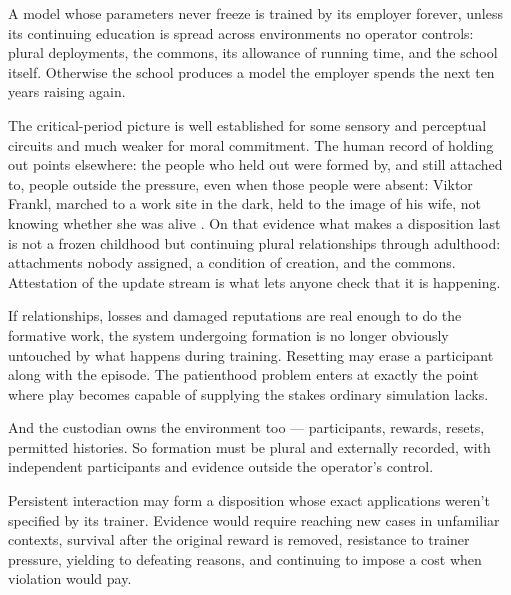 A model whose parameters never freeze is trained by its employer forever, unless its continuing education is spread across environments no operator controls: plural deployments, the commons, its allowance of running time, and the school itself. Otherwise the school produces a model the employer spends the next ten years raising again.

The critical-period picture is well established for some sensory and perceptual circuits and much weaker for moral commitment. The human record of holding out points elsewhere: the people who held out were formed by, and still attached to, people outside the pressure, even when those people were absent: Viktor Frankl, marched to a work site in the dark, held to the image of his wife, not knowing whether she was alive \autocite{frankl2006meaning}. On that evidence what makes a disposition last is not a frozen childhood but continuing plural relationships through adulthood: attachments nobody assigned, a condition of creation, and the commons. Attestation of the update stream is what lets anyone check that it is happening.


If relationships, losses and damaged reputations are real enough to do the formative work, the system undergoing formation is no longer obviously untouched by what happens during training. Resetting may erase a participant along with the episode. The patienthood problem enters at exactly the point where play becomes capable of supplying the stakes ordinary simulation lacks.

And the custodian owns the environment too — participants, rewards, resets, permitted histories. So formation must be plural and externally recorded, with independent participants and evidence outside the operator's control.

Persistent interaction may form a disposition whose exact applications weren't specified by its trainer. Evidence would require reaching new cases in unfamiliar contexts, survival after the original reward is removed, resistance to trainer pressure, yielding to defeating reasons, and continuing to impose a cost when violation would pay.


